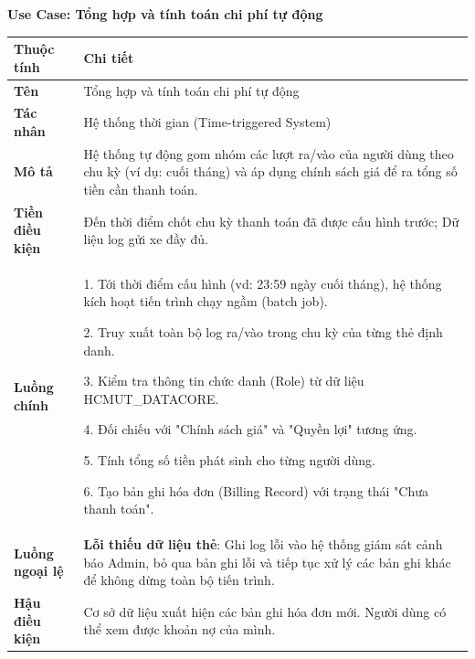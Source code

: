 \noindent \textbf{Use Case: Tổng hợp và tính toán chi phí tự động} \\
\renewcommand{\arraystretch}{1.6}
\begin{xltabular}{\textwidth}{|l|X|}
\hline
\textbf{Thuộc tính} & \textbf{Chi tiết} \\
\hline
\textbf{Tên} & Tổng hợp và tính toán chi phí tự động \\
\hline
\textbf{Tác nhân} & Hệ thống thời gian (Time-triggered System) \\
\hline
\textbf{Mô tả} & Hệ thống tự động gom nhóm các lượt ra/vào của người dùng theo chu kỳ (ví dụ: cuối tháng) và áp dụng chính sách giá để ra tổng số tiền cần thanh toán. \\
\hline
\textbf{Tiền điều kiện} & Đến thời điểm chốt chu kỳ thanh toán đã được cấu hình trước; Dữ liệu log gửi xe đầy đủ. \\
\hline
\textbf{Luồng chính} & 
1. Tới thời điểm cấu hình (vd: 23:59 ngày cuối tháng), hệ thống kích hoạt tiến trình chạy ngầm (batch job).

2. Truy xuất toàn bộ log ra/vào trong chu kỳ của từng thẻ định danh.

3. Kiểm tra thông tin chức danh (Role) từ dữ liệu HCMUT\_DATACORE.

4. Đối chiếu với "Chính sách giá" và "Quyền lợi" tương ứng.

5. Tính tổng số tiền phát sinh cho từng người dùng.

6. Tạo bản ghi hóa đơn (Billing Record) với trạng thái "Chưa thanh toán".
\\
\hline

\textbf{Luồng ngoại lệ} & 
\textbf{Lỗi thiếu dữ liệu thẻ}: Ghi log lỗi vào hệ thống giám sát cảnh báo Admin, bỏ qua bản ghi lỗi và tiếp tục xử lý các bản ghi khác để không dừng toàn bộ tiến trình.
\\
\hline

\textbf{Hậu điều kiện} & Cơ sở dữ liệu xuất hiện các bản ghi hóa đơn mới. Người dùng có thể xem được khoản nợ của mình.\\
\hline
\end{xltabular}

